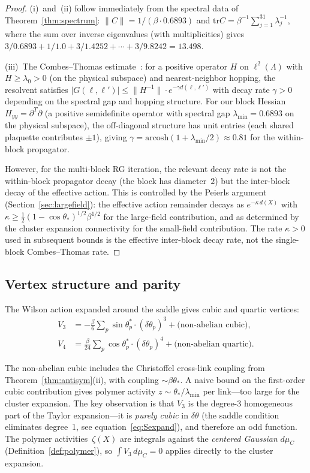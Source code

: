 \documentclass[11pt]{article}
\theoremstyle{definition}
\newcommand{\tr}{\mathrm{tr}}
\begin{document}
\begin{proof}
(i)~and~(ii) follow immediately from the spectral data of
Theorem~\ref{thm:spectrum}: $\|C\|=1/(\beta\cdot 0.6893)$
and $\tr C=\beta^{-1}\sum_{j=1}^{31}\lambda_j^{-1}$, where the sum
over inverse eigenvalues (with multiplicities) gives
$3/0.6893+1/1.0+3/1.4252+\cdots+3/9.8242=13.498$.

(iii)~The Combes--Thomas estimate~\cite{CombesThomas}: for a positive
operator $H$ on $\ell^2(\Lambda)$ with $H\ge\lambda_0>0$ (on the
physical subspace) and nearest-neighbor hopping, the resolvent
satisfies $|G(\ell,\ell')|\le\|H^{-1}\|\cdot e^{-\gamma d(\ell,\ell')}$
with decay rate $\gamma>0$ depending on the spectral gap and hopping
structure.  For our block Hessian $H_{yy}=\partial^T\partial$ (a
positive semidefinite operator with spectral gap $\lambda_{\min}=0.6893$
on the physical subspace), the off-diagonal structure has unit entries
(each shared plaquette contributes $\pm 1$), giving
$\gamma=\mathrm{arcosh}(1+\lambda_{\min}/2)\approx 0.81$
for the within-block propagator.

However, for the multi-block RG iteration, the relevant decay rate is
not the within-block propagator decay (the block has diameter~$2$) but
the inter-block decay of the effective action.  This is controlled by
the Peierls argument (Section~\ref{sec:largefield}): the effective
action remainder decays as $e^{-\kappa\,d(X)}$ with
$\kappa\ge\frac{1}{2}(1-\cos\theta_*)^{1/2}\beta^{1/2}$ for the
large-field contribution, and as determined by the cluster expansion
connectivity for the small-field contribution.  The rate
$\kappa>0$ used in subsequent bounds is the effective inter-block
decay rate, not the single-block Combes--Thomas rate.
\end{proof}

\subsection{Vertex structure and parity}

The Wilson action expanded around the saddle gives cubic and quartic
vertices:
\begin{align}
V_3&=-\frac{\beta}{6}\sum_p\sin\theta_p^*\cdot(\delta\theta_p)^3
+\text{(non-abelian cubic)},\\
V_4&=\frac{\beta}{24}\sum_p\cos\theta_p^*\cdot(\delta\theta_p)^4
+\text{(non-abelian quartic)}.
\end{align}

The non-abelian cubic includes the Christoffel cross-link coupling
from Theorem~\ref{thm:antisym}(ii), with coupling $\sim\beta\theta_*$.
A naive bound on the first-order cubic contribution gives polymer
activity $z\sim\theta_*/\lambda_{\min}$ per link---too large for the
cluster expansion.  The key observation is that $V_3$ is the
degree-3 homogeneous part of the Taylor expansion---it is \emph{purely
cubic} in $\delta\theta$ (the saddle condition eliminates degree~1,
see equation~\eqref{eq:Sexpand}), and therefore an odd function.
The polymer activities~$\zeta(X)$
are integrals against the \emph{centered Gaussian} $d\mu_C$
(Definition~\ref{def:polymer}), so
$\int V_3\,d\mu_C=0$ applies directly to the cluster expansion.
\end{document}
